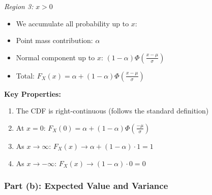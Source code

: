 \documentclass[12pt]{article}
\begin{document}
\begin{explanation}
\textit{Region 3: } \(x > 0\)
\begin{itemize}
    \item We accumulate all probability up to \(x\):
    \item Point mass contribution: \(\alpha\)
    \item Normal component up to \(x\): \((1-\alpha) \Phi\left(\frac{x-\mu}{\sigma}\right)\)
    \item Total: \(F_X(x) = \alpha + (1-\alpha) \Phi\left(\frac{x-\mu}{\sigma}\right)\)
\end{itemize}

\textbf{Key Properties:}
\begin{enumerate}
    \item The CDF is right-continuous (follows the standard definition)
    \item At \(x = 0\): \(F_X(0) = \alpha + (1-\alpha)\Phi\left(\frac{-\mu}{\sigma}\right)\)
    \item As \(x \to \infty\): \(F_X(x) \to \alpha + (1-\alpha) \cdot 1 = 1\)
    \item As \(x \to -\infty\): \(F_X(x) \to (1-\alpha) \cdot 0 = 0\)
\end{enumerate}
\end{explanation}

\subsubsection{Part (b): Expected Value and Variance}
\end{document}
